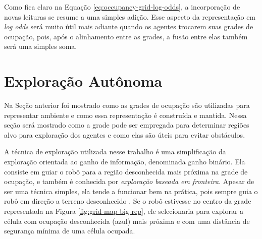 Como fica claro na Equação \ref{eq:occupancy-grid-log-odds}, a 
incorporação de novas leituras se resume a uma simples adição. Esse 
aspecto da representação em \textit{log odds} será muito útil mais 
adiante quando os agentes trocarem suas grades de ocupação, pois, após 
o alinhamento entre as grades, a fusão entre elas também será uma simples 
soma.

\section{Exploração Autônoma}
\label{sec:autonomous-exploration}
Na Seção anterior foi mostrado como as grades de ocupação são utilizadas 
para representar ambiente e como essa representação é construída e 
mantida. Nessa seção será mostrado como a grade pode ser empregada para 
determinar regiões alvo para exploração dos agentes e como elas são 
úteis para evitar obstáculos.

A técnica de exploração utilizada nesse trabalho é uma simplificação 
da exploração orientada ao ganho de informação, denominada ganho binário. 
Ela consiste em guiar o robô para a região desconhecida mais próxima 
na grade de ocupação, e também é conhecida por \emph{exploração baseada em fronteira}. Apesar de ser uma técnica simples, ela tende a funcionar 
bem na prática, pois sempre guia o robô em direção a terreno desconhecido 
\cite[p.~584]{thrun2005probabilistic}. Se o robô estivesse no centro 
da grade representada na Figura \ref{fig:grid-map-big-rep}, ele 
selecionaria para explorar a célula com ocupação desconhecida (azul) mais próxima e com uma distância de segurança mínima de uma célula ocupada.

